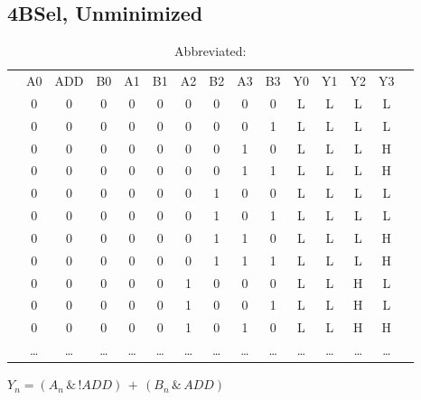 \documentclass[letterpaper,titlepage,oneside]{article}
\begin{document}
\pagebreak
\subsection*{4BSel, Unminimized}

\begin{table}['h']
\begin{center}

\begin{tabular}{c|c|c|c|c|c|c|c|c|c|c|c|c|c|c}
\cline{2-14}
 & A0 & ADD & B0 & A1 & B1 & A2 & B2 & A3 & B3 & Y0 & Y1 & Y2 & Y3 &  \\ \cline{2-14}

 & 0 & 0 & 0 & 0 & 0 & 0 & 0 & 0 & 0 & L & L & L & L\\
 & 0 & 0 & 0 & 0 & 0 & 0 & 0 & 0 & 1 & L & L & L & L\\
 & 0 & 0 & 0 & 0 & 0 & 0 & 0 & 1 & 0 & L & L & L & H\\
 & 0 & 0 & 0 & 0 & 0 & 0 & 0 & 1 & 1 & L & L & L & H\\
 & 0 & 0 & 0 & 0 & 0 & 0 & 1 & 0 & 0 & L & L & L & L\\
 & 0 & 0 & 0 & 0 & 0 & 0 & 1 & 0 & 1 & L & L & L & L\\
 & 0 & 0 & 0 & 0 & 0 & 0 & 1 & 1 & 0 & L & L & L & H\\
 & 0 & 0 & 0 & 0 & 0 & 0 & 1 & 1 & 1 & L & L & L & H\\
 & 0 & 0 & 0 & 0 & 0 & 1 & 0 & 0 & 0 & L & L & H & L\\
 & 0 & 0 & 0 & 0 & 0 & 1 & 0 & 0 & 1 & L & L & H & L\\
 & 0 & 0 & 0 & 0 & 0 & 1 & 0 & 1 & 0 & L & L & H & H\\
 & \ldots{} & \ldots{} & \ldots{} & \ldots{} & \ldots{} & \ldots{} & %
\ldots{} & \ldots{} & \ldots{} & \ldots{} & \ldots{} & \ldots{} & \ldots{} &\\
\cline{2-14}
\end{tabular}
\caption{Abbreviated: }\label{table:4BSel_Unminimized}
\begin{normalsize}
$Y_{n} = (A_{n} \,\&\, !ADD) \,+\, (B_{n} \,\&\, ADD)$
\end{normalsize}
\end{center}
\end{table}
\end{document}
